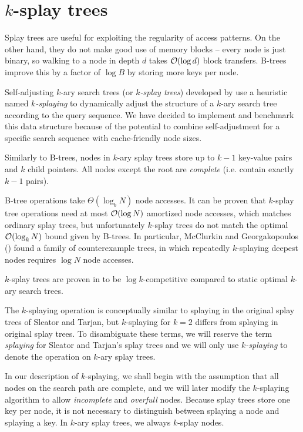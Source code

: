 \chapter{$k$-splay trees}
\label{chapter:ksplay}
Splay trees are useful for exploiting the regularity of access patterns.
On the other hand, they do not make good use of memory blocks -- every node
is just binary, so walking to a node in depth $d$ takes $\mathcal{O}(\log d)$ block
transfers. B-trees improve this by a factor of $\log B$ by storing more keys
per node.

Self-adjusting $k$-ary search trees (or \emph{$k$-splay trees}) developed
by \cite{ksplay-sherk} use a heuristic named \emph{$k$-splaying}
to dynamically adjust the structure of a $k$-ary search tree according to
the query sequence. We have decided to implement and benchmark this data
structure because of the potential to combine self-adjustment for a specific
search sequence with cache-friendly node sizes.

Similarly to B-trees, nodes in $k$-ary splay trees store up to $k-1$ key-value
pairs and $k$ child pointers. All nodes except the root are \emph{complete}
(i.e. contain exactly $k-1$ pairs).

B-tree operations take $\Theta(\log_b N)$ node accesses. It can be proven that
$k$-splay tree operations need at most $\mathcal{O}(\log N)$ amortized node accesses,
which matches ordinary splay trees, but unfortunately $k$-splay trees
do not match the optimal $\mathcal{O}(\log_k N)$ bound given by B-trees. In particular,
McClurkin and Georgakopoulos (\citeyear{ksplay-nonopt}) found a family
of counterexample trees, in which repeatedly $k$-splaying deepest nodes
requires $\log N$ node accesses.

$k$-splay trees are proven in \cite{ksplay-sherk} to be $\log k$-competitive
compared to static optimal $k$-ary search trees.

The $k$-splaying operation is conceptually similar to splaying in the original
splay trees of Sleator and Tarjan, but $k$-splaying for $k=2$ differs from
splaying in original splay trees. To disambiguate these terms, we will
reserve the term \emph{splaying} for Sleator and Tarjan's splay trees and
we will only use \emph{$k$-splaying} to denote the operation
on $k$-ary splay trees.

In our description of $k$-splaying, we shall begin with the assumption that
all nodes on the search path are complete, and we will later modify
the $k$-splaying algorithm to allow \emph{incomplete} and \emph{overfull}
nodes.
Because splay trees store one key per node, it is not necessary to distinguish
between splaying a node and splaying a key. In $k$-ary splay trees, we always
$k$-splay nodes.

